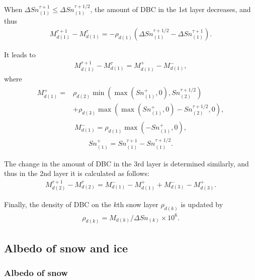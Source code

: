 When \(\Delta Sn^{\tau+1}_{(1)} \leq \Delta Sn^{\tau+1/2}_{(1)}\), the amount of DBC in the 1st layer decreases, and thus \begin{eqnarray}
M_{d(1)}^{\tau+1} - M_{d(1)}^{\tau}
 = -\rho_{d(1)} \left( \Delta Sn^{\tau+1/2}_{(1)} - \Delta Sn^{\tau+1}_{(1)} \right). \label{8-51}
\end{eqnarray}

It leads to \begin{eqnarray}
M_{d(1)}^{\tau+1} - M_{d(1)}^{\tau} = M_{d(1)}^{+} - M_{d(1)}^{-}, \label{8-52}
\end{eqnarray} where \begin{eqnarray}
\begin{aligned}
M_{d(1)}^{+}
 = &\rho_{d(2)} \min\left( \max\left( Sn^+_{(1)}, 0 \right), Sn_{(2)}^{\tau+1/2} \right) \\
 & + \rho_{d(3)} \max\left( \max\left( Sn^+_{(1)}, 0 \right) - Sn_{(2)}^{\tau+1/2}, 0 \right),
\end{aligned}
\label{8-53}
\end{eqnarray} \begin{eqnarray}
M_{d(1)}^{-}
 = \rho_{d(1)} \max\left( -Sn^+_{(1)}, 0 \right),  \label{8-54}
\end{eqnarray} \begin{eqnarray}
Sn^+_{(1)}
 = Sn_{(1)}^{\tau+1} - Sn_{(1)}^{\tau+1/2}. \label{8-55}
\end{eqnarray}

The change in the amount of DBC in the 3rd layer is determined similarly, and thus in the 2nd layer it is calculated as follows: \begin{eqnarray}
M_{d(2)}^{\tau+1} - M_{d(2)}^{\tau}
 = M_{d(1)}^{-} - M_{d(1)}^{+} + M_{d(3)}^{-} - M_{d(3)}^{+}. \label{8-56}
\end{eqnarray}

Finally, the density of DBC on the \(k\)th snow layer \(\rho_{d(k)}\) is updated by \begin{eqnarray}
\rho_{d(k)} = M_{d(k)} / \Delta Sn_{(k)} \times 10^6. \label{8-57}
\end{eqnarray}

\subsection{Albedo of snow and ice}\label{albedo-of-snow-and-ice}

\subsubsection{Albedo of snow}\label{albedo-of-snow}


